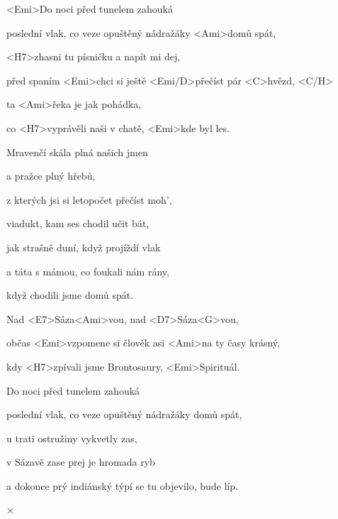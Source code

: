 

\zs
<Emi>Do noci před tunelem zahouká

poslední vlak, co veze opuštěný nádražáky <Ami>domů spát,

<H7>zhasni tu písničku a napít mi dej,

před spaním <Emi>chci si ještě <Emi/D>přečíst pár <C>hvězd, <C/H>

ta <Ami>řeka je jak pohádka,

co <H7>vyprávěli naši v chatě, <Emi>kde byl les.
\ks

\zs
Mravenčí skála plná našich jmen

a pražce plný hřebů,

z kterých jsi si letopočet přečíst moh',

viadukt, kam ses chodil učit bát,

jak strašně duní, když projíždí vlak

a táta s mámou, co foukali nám rány,

když chodili jsme domů spát.
\ks

\zr
Nad <E7>Sáza<Ami>vou, nad <D7>Sáza<G>vou,

občas <Emi>vzpomene si člověk asi <Ami>na ty časy krásný,

kdy <H7>zpívali jsme Brontosaury, <Emi>Spirituál.
\kr

\zs
Do noci před tunelem zahouká

poslední vlak, co veze opuštěný nádražáky domů spát,

u trati ostružiny vykvetly zas,

v Sázavě zase prej je hromada ryb

a dokonce prý indiánský týpí se tu objevilo, bude líp.
\ks

× \kr

\kp

